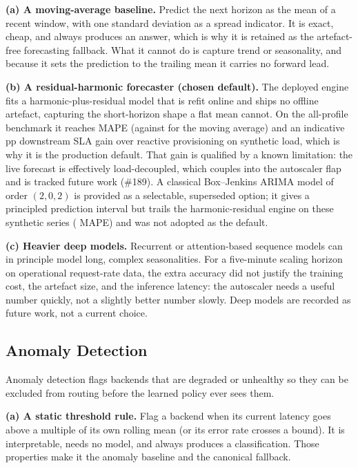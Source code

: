\textbf{(a) A moving-average baseline.} Predict the next horizon as the mean of
a recent window, with one standard deviation as a spread indicator. It is exact,
cheap, and always produces an answer, which is why it is retained as the
artefact-free forecasting fallback. What it cannot do is capture trend or
seasonality, and because it sets the prediction to the trailing mean it carries
no forward lead.

\textbf{(b) A residual-harmonic forecaster (chosen default).} The deployed engine
fits a harmonic-plus-residual model that is refit online and ships no offline
artefact, capturing the short-horizon shape a flat mean cannot. On the all-profile
benchmark it reaches \BMfcMape{} MAPE (against \BMfcMapeMA{} for the moving average) and an
indicative \BMfcSlaGain{}\,pp downstream SLA gain over reactive provisioning on synthetic
load, which is why it is the production default. That gain is qualified by a known
limitation: the live forecast is effectively load-decoupled, which couples into the
autoscaler flap and is tracked future work (\#189). A classical Box--Jenkins ARIMA model
\cite{box2015timeseries,hyndman2021forecasting} of order $(2,0,2)$ is provided as a
selectable, superseded option; it gives a principled prediction interval but trails
the harmonic-residual engine on these synthetic series (\BMfcMapeArima{} MAPE) and was not
adopted as the default.

\textbf{(c) Heavier deep models.} Recurrent or attention-based sequence models
can in principle model long, complex seasonalities. For a five-minute scaling
horizon on operational request-rate data, the extra accuracy did not justify
the training cost, the artefact size, and the inference latency: the autoscaler
needs a useful number quickly, not a slightly better number slowly. Deep models
are recorded as future work, not a current choice.

\subsection{Anomaly Detection}
\label{dsb:alt-anomaly}

Anomaly detection flags backends that are degraded or unhealthy so they can be
excluded from routing before the learned policy ever sees them.

\textbf{(a) A static threshold rule.} Flag a backend when its current latency
goes above a multiple of its own rolling mean (or its error rate crosses a
bound). It is interpretable, needs no model, and always produces a
classification. Those properties make it the anomaly baseline and the canonical
fallback.

